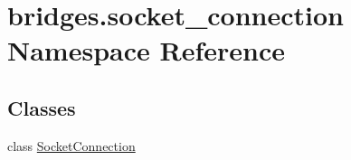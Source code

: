 \hypertarget{namespacebridges_1_1socket__connection}{}\section{bridges.\+socket\+\_\+connection Namespace Reference}
\label{namespacebridges_1_1socket__connection}
\subsection*{Classes}
\begin{DoxyCompactItemize}
\item 
class \mbox{\hyperlink{classbridges_1_1socket__connection_1_1_socket_connection}{Socket\+Connection}}
\end{DoxyCompactItemize}
